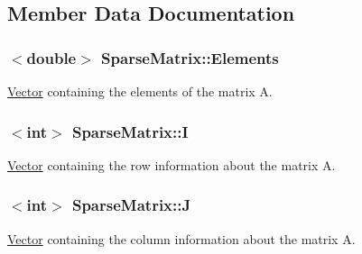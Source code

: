 \subsection{Member Data Documentation}
\hypertarget{class_sparse_matrix_a3ed1cb2b0a0dd4b6c7220c49d6535efb}{}
\subsubsection[{Elements}]{$<$double$>$ Sparse\+Matrix\+::\+Elements\hspace{0.3cm}{\ttfamily [private]}}\label{class_sparse_matrix_a3ed1cb2b0a0dd4b6c7220c49d6535efb}


\hyperlink{class_vector}{Vector} containing the elements of the matrix A. 

\hypertarget{class_sparse_matrix_ab44942445ac457aaa6e984615fcf7b49}{}
\subsubsection[{I}]{$<$int$>$ Sparse\+Matrix\+::\+I\hspace{0.3cm}{\ttfamily [private]}}\label{class_sparse_matrix_ab44942445ac457aaa6e984615fcf7b49}


\hyperlink{class_vector}{Vector} containing the row information about the matrix A. 

\hypertarget{class_sparse_matrix_a9febac8d56047bfcb48c6849f9b8ebcd}{}
\subsubsection[{J}]{$<$int$>$ Sparse\+Matrix\+::\+J\hspace{0.3cm}{\ttfamily [private]}}\label{class_sparse_matrix_a9febac8d56047bfcb48c6849f9b8ebcd}


\hyperlink{class_vector}{Vector} containing the column information about the matrix A. 

\hypertarget{class_sparse_matrix_aad150f4ad676a2919a478457e7c050d3}{}
